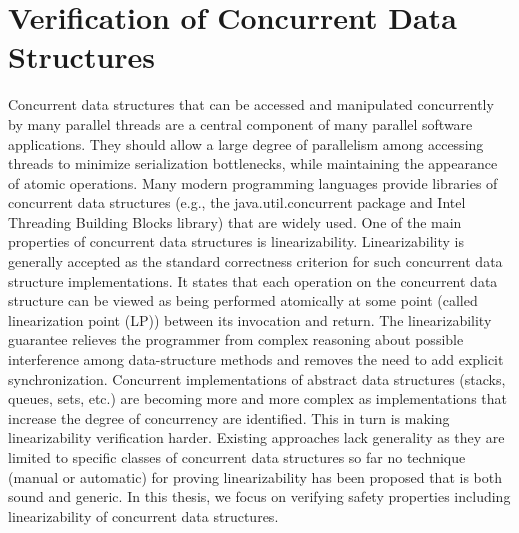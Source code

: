 \section*{Verification of Concurrent Data Structures}
Concurrent data structures that can be accessed and manipulated concurrently by many parallel threads are a central component of many parallel software applications. They should allow a large degree of parallelism among accessing threads to minimize serialization bottlenecks, while maintaining the appearance of atomic operations. Many modern programming languages provide libraries of concurrent data structures (e.g., the java.util.concurrent package and Intel Threading Building Blocks library) that are widely used. One of the main properties of concurrent data structures is linearizability. Linearizability is generally accepted as the standard correctness criterion for such concurrent data structure implementations. It states that each operation on the concurrent data structure can be viewed as being performed atomically at some point (called linearization point (LP)) between its invocation and return. The linearizability guarantee relieves the programmer from complex reasoning about possible interference among data-structure methods and removes the need to add explicit synchronization. Concurrent implementations of abstract data structures (stacks, queues, sets, etc.) are becoming more and more complex as implementations that increase the degree of concurrency are identified. This in turn is making linearizability verification harder. Existing approaches lack generality as they are limited to specific classes of concurrent data structures so far no technique (manual or automatic) for proving linearizability has been proposed that is both sound and generic. In this thesis, we focus on verifying safety properties including linearizability of concurrent data structures.
